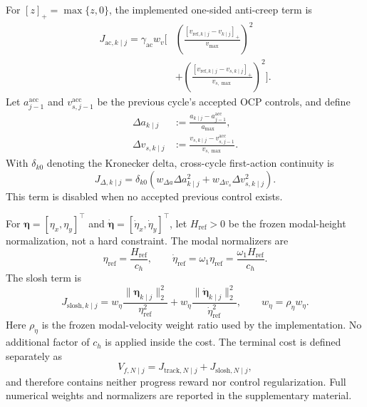 For \([z]_+=\max\{z,0\}\), the implemented one-sided anti-creep term is
\begin{equation}
\begin{aligned}
J_{\mathrm{ac},k\mid j}
=\gamma_{\mathrm{ac}}w_v
\bigg[
&\left(
\frac{[v_{\mathrm{ref},k\mid j}-v_{k\mid j}]_+}{v_{\max}}
\right)^2\\
&+
\left(
\frac{[v_{\mathrm{ref},k\mid j}-v_{s,k\mid j}]_+}{v_{s,\max}}
\right)^2
\bigg].
\end{aligned}
\label{eq:anti_creep_cost}
\end{equation}
Let \(a_{j-1}^{\mathrm{acc}}\) and \(v_{s,j-1}^{\mathrm{acc}}\) be the
previous cycle's accepted OCP controls, and define
\begin{equation}
\begin{aligned}
  \Delta a_{k\mid j}
  &:=\frac{a_{k\mid j}-a_{j-1}^{\mathrm{acc}}}{a_{\max}},\\
  \Delta v_{s,k\mid j}
  &:=\frac{v_{s,k\mid j}-v_{s,j-1}^{\mathrm{acc}}}{v_{s,\max}}.
\end{aligned}
  \label{eq:cross_cycle_differences}
\end{equation}
With \(\delta_{k0}\) denoting the Kronecker delta, cross-cycle first-action
continuity is
\begin{equation}
  J_{\Delta,k\mid j}
  =\delta_{k0}\left(
  w_{\Delta a}\Delta a_{k\mid j}^2
  +w_{\Delta v_s}\Delta v_{s,k\mid j}^2
  \right).
  \label{eq:cross_cycle_cost}
\end{equation}
This term is disabled when no accepted previous control exists.

For
\(\bm\eta=[\eta_x,\eta_y]^\top\) and
\(\dot{\bm\eta}=[\dot\eta_x,\dot\eta_y]^\top\), let
\(H_{\mathrm{ref}}>0\) be the frozen modal-height normalization, not a hard
constraint. The modal normalizers are
\begin{equation}
  \eta_{\mathrm{ref}}=\frac{H_{\mathrm{ref}}}{c_h},
  \qquad
  \dot\eta_{\mathrm{ref}}
  =\omega_1\eta_{\mathrm{ref}}
  =\frac{\omega_1H_{\mathrm{ref}}}{c_h}.
  \label{eq:modal_normalizers}
\end{equation}
The slosh term is
\begin{equation}
  J_{\mathrm{slosh},k\mid j}
  =w_\eta
  \frac{\|\bm\eta_{k\mid j}\|_2^2}{\eta_{\mathrm{ref}}^2}
  +w_{\dot\eta}
  \frac{\|\dot{\bm\eta}_{k\mid j}\|_2^2}
  {\dot\eta_{\mathrm{ref}}^2},
  \qquad
  w_{\dot\eta}=\rho_{\dot\eta}w_\eta.
  \label{eq:slosh_cost}
\end{equation}
Here \(\rho_{\dot\eta}\) is the frozen modal-velocity weight ratio used by the
implementation. No additional factor of \(c_h\) is applied inside the cost.
The terminal cost is defined separately as
\begin{equation}
  V_{f,N\mid j}
  =J_{\mathrm{track},N\mid j}
  +J_{\mathrm{slosh},N\mid j},
  \label{eq:terminal_cost}
\end{equation}
and therefore contains neither progress reward nor control regularization.
Full numerical weights and normalizers are reported in the supplementary
material.

